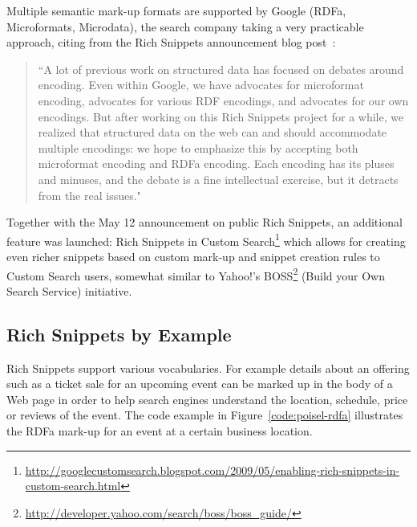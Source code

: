 \documentclass[12pt]{article}
\begin{document}
Multiple semantic mark-up formats are supported by Google (RDFa, Microformats, Microdata), the search company taking a very practicable approach, citing from the Rich Snippets announcement blog post~\cite{Goel:Blog09}:
\begin{quotation}
``A lot of previous work on structured data has focused on debates around encoding. Even within Google, we have advocates for microformat encoding, advocates for various RDF encodings, and advocates for our own encodings. But after working on this Rich Snippets project for a while, we realized that structured data on the web can and should accommodate multiple encodings: we hope to emphasize this by accepting both microformat encoding and RDFa encoding. Each encoding has its pluses and minuses, and the debate is a fine intellectual exercise, but it detracts from the real issues."
\end{quotation}
Together with the May 12 announcement on public Rich Snippets, an additional feature was launched: Rich Snippets in Custom Search\footnote{\url{http://googlecustomsearch.blogspot.com/2009/05/enabling-rich-snippets-in-custom-search.html}} which allows for creating even richer snippets based on custom mark-up and snippet creation rules to Custom Search users, somewhat similar to Yahoo!'s BOSS\footnote{\url{http://developer.yahoo.com/search/boss/boss_guide/}} (Build your Own Search Service) initiative.

\subsection{Rich Snippets by Example}                   \label{sec:rich-snippets-example} 
Rich Snippets support various vocabularies. For example details about an offering such as a ticket sale for an upcoming event can be marked up in the body of a Web page in order to help search engines understand the location, schedule, price or reviews of the event. The code example in Figure~\ref{code:poisel-rdfa} illustrates the RDFa mark-up for an event at a certain business location.
\end{document}
